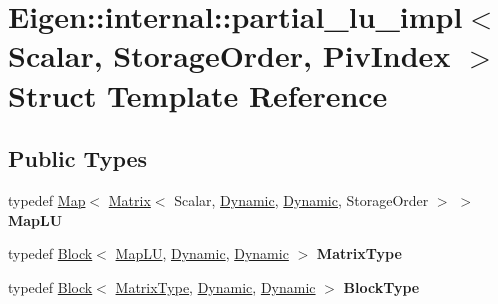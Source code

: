\hypertarget{struct_eigen_1_1internal_1_1partial__lu__impl}{}\section{Eigen\+:\+:internal\+:\+:partial\+\_\+lu\+\_\+impl$<$ Scalar, Storage\+Order, Piv\+Index $>$ Struct Template Reference}
\label{struct_eigen_1_1internal_1_1partial__lu__impl}
\subsection*{Public Types}
\begin{DoxyCompactItemize}
\item 
\mbox{\label{struct_eigen_1_1internal_1_1partial__lu__impl_ac7d76f45eeb96ba883c796772dc74191}} 
typedef \hyperlink{group___core___module_class_eigen_1_1_map}{Map}$<$ \hyperlink{group___core___module_class_eigen_1_1_matrix}{Matrix}$<$ Scalar, \hyperlink{namespace_eigen_ad81fa7195215a0ce30017dfac309f0b2}{Dynamic}, \hyperlink{namespace_eigen_ad81fa7195215a0ce30017dfac309f0b2}{Dynamic}, Storage\+Order $>$ $>$ {\bfseries Map\+LU}
\item 
\mbox{\label{struct_eigen_1_1internal_1_1partial__lu__impl_aef9745ce92a2b897556eca8b407aaf57}} 
typedef \hyperlink{group___core___module_class_eigen_1_1_block}{Block}$<$ \hyperlink{group___core___module_class_eigen_1_1_map}{Map\+LU}, \hyperlink{namespace_eigen_ad81fa7195215a0ce30017dfac309f0b2}{Dynamic}, \hyperlink{namespace_eigen_ad81fa7195215a0ce30017dfac309f0b2}{Dynamic} $>$ {\bfseries Matrix\+Type}
\item 
\mbox{\label{struct_eigen_1_1internal_1_1partial__lu__impl_ad63bb1112bcc2ea7fe95267d79c5f0af}} 
typedef \hyperlink{group___core___module_class_eigen_1_1_block}{Block}$<$ \hyperlink{group___core___module_class_eigen_1_1_block}{Matrix\+Type}, \hyperlink{namespace_eigen_ad81fa7195215a0ce30017dfac309f0b2}{Dynamic}, \hyperlink{namespace_eigen_ad81fa7195215a0ce30017dfac309f0b2}{Dynamic} $>$ {\bfseries Block\+Type}
\item 
\mbox{\label{struct_eigen_1_1internal_1_1partial__lu__impl_a66b78c8f3358a04ed1a11be0d4e65c69}} 

\end{DoxyCompactItemize}
